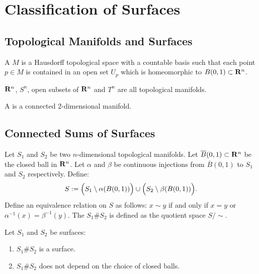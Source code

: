 \chapter{Classification of Surfaces}

\section{Topological Manifolds and Surfaces}

\begin{definition}
	A  $M$ is a Hausdorff topological space with a countable basis such that each point $p \in M$ is contained in an open set $U_p$ which is homeomorphic to $B(0,1) \subset \mathbf{R}^n$.
\end{definition}

\begin{example}
	$\mathbf{R}^n$, $S^n$, open subsets of $\mathbf{R}^n$ and $T^n$ are all topological manifolds.
\end{example}

\begin{definition}
	A  is a connected 2-dimensional manifold.
\end{definition}

\section{Connected Sums of Surfaces}

\begin{definition}
	Let $S_1$ and $S_2$ be two $n$-dimensional topological manifolds. Let $\overline{B}(0,1) \subset \mathbf{R}^n$ be the closed ball in $\mathbf{R}^n$. Let $\alpha$ and $\beta$ be continuous injections from $\overline{B}(0,1)$ to $S_1$ and $S_2$ respectively. Define:
	\[
		S:=\Bigl(S_1 \setminus \alpha(B(0,1)) \Bigr) \cup \Bigl(S_2 \setminus \beta(B(0,1)) \Bigr).
	\] 
	Define an equivalence relation on $S$ as follows: $x \sim y$ if and only if $x=y$ or $\alpha^{-1}(x) = \beta^{-1}(y)$. The  $S_1 \# S_2$ is defined as the quotient space $S/\sim$.
\end{definition}

\begin{proposition}
	Let $S_1$ and $S_2$ be surfaces:
	\begin{enumerate}[label = (\alph*),itemsep=1pt,topsep=3pt]
		\item $S_1 \# S_2$ is a surface.
		\item $S_1 \# S_2$ does not depend on the choice of closed balls.
	\end{enumerate}
\end{proposition}

